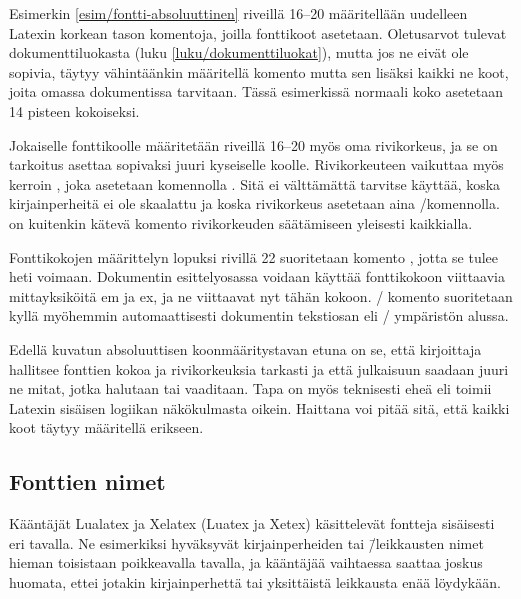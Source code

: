 \begin{koodilohkosis}
\sffamilyabs\Large\bfseries
\end{koodilohkosis}

\noindent
Esimerkin \ref{esim/fontti-absoluuttinen} riveillä 16--20 määritellään
uudelleen Latexin korkean tason komentoja, joilla fonttikoot asetetaan.
Oletusarvot tulevat dokumenttiluokasta (luku
\ref{luku/dokumenttiluokat}), mutta jos ne eivät ole sopivia, täytyy
vähintäänkin määritellä komento  mutta sen lisäksi
kaikki ne koot, joita omassa dokumentissa tarvitaan. Tässä esimerkissä
normaali koko asetetaan 14 pisteen kokoiseksi.

Jokaiselle fonttikoolle määritetään riveillä 16--20 myös oma
rivikorkeus, ja se on tarkoitus asettaa sopivaksi juuri kyseiselle
koolle. Rivikorkeuteen vaikuttaa myös kerroin ,
joka asetetaan komennolla . Sitä ei välttämättä
tarvitse käyttää, koska kirjainperheitä ei ole skaalattu ja koska
rivikorkeus asetetaan aina \-/komennolla.
 on kuitenkin kätevä komento rivikorkeuden
säätämiseen yleisesti kaikkialla.

Fonttikokojen määrittelyn lopuksi rivillä 22 suoritetaan komento
, jotta se tulee heti voimaan. Dokumentin
esittelyosassa voidaan käyttää fonttikokoon viittaavia mittayksiköitä em
ja ex, ja ne viittaavat nyt tähän kokoon. \-/
komento suoritetaan kyllä myöhemmin automaattisesti dokumentin
tekstiosan eli \-/ ympäristön alussa.

Edellä kuvatun absoluuttisen koonmääritystavan etuna on se, että
kirjoittaja hallitsee fonttien kokoa ja rivikorkeuksia tarkasti ja että
julkaisuun saadaan juuri ne mitat, jotka halutaan tai vaaditaan. Tapa on
myös teknisesti eheä eli toimii Latexin sisäisen logiikan näkökulmasta
oikein. Haittana voi pitää sitä, että kaikki koot täytyy määritellä
erikseen.

\subsection{Fonttien nimet}
\label{luku/luatex-xetex-fonttinimet}

Kääntäjät Lualatex ja Xelatex (Luatex ja Xetex) käsittelevät fontteja
sisäisesti eri tavalla. Ne esimerkiksi hyväksyvät kirjainperheiden tai
\=/leikkausten nimet hieman toisistaan poikkeavalla tavalla, ja
kääntäjää vaihtaessa saattaa joskus huomata, ettei jotakin
kirjainperhettä tai yksittäistä leikkausta enää löydykään.

